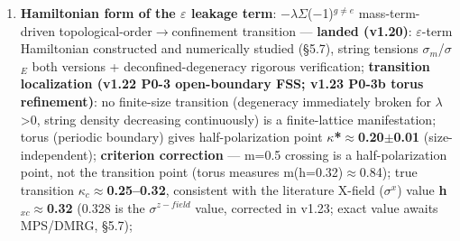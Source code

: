 \documentclass[12pt]{article}
\newcommand{\up}[1]{\ensuremath{^{#1}}}
\newcommand{\down}[1]{\ensuremath{_{#1}}}
\begin{document}
\begin{enumerate}
\item \textbf{Hamiltonian form of the \ensuremath{\varepsilon} leakage term}: \ensuremath{-}\ensuremath{\lambda}\ensuremath{\Sigma}(\ensuremath{-}1)\up{g\neq{}e} mass-term-driven topological-order\ensuremath{\to}confinement transition --- \textbf{\checkmark landed (v1.20)}: \ensuremath{\varepsilon}-term Hamiltonian constructed and numerically studied (\S{}5.7), string tensions \ensuremath{\sigma}\down{m}/\ensuremath{\sigma}\down{E} both versions + deconfined-degeneracy rigorous verification; \textbf{\checkmark transition localization (v1.22 P0-3 open-boundary FSS; v1.23 P0-3b torus refinement)}: no finite-size transition (degeneracy immediately broken for \ensuremath{\lambda}>0, string density decreasing continuously) is a finite-lattice manifestation; torus (periodic boundary) gives half-polarization point \textbf{\ensuremath{\kappa}*\ensuremath{\approx}0.20\ensuremath{\pm}0.01} (size-independent); \textbf{criterion correction} --- m=0.5 crossing is a half-polarization point, not the transition point (torus measures m(h=0.32)\ensuremath{\approx}0.84); true transition \textbf{\ensuremath{\kappa}\down{c}\ensuremath{\approx}0.25--0.32}, consistent with the literature X-field (\ensuremath{\sigma}\up{x}) value \textbf{h\down{xc}\ensuremath{\approx}0.32} (0.328 is the \ensuremath{\sigma}\up{z-field} value, corrected in v1.23; exact value awaits MPS/DMRG, \S{}5.7);

\end{enumerate}
\end{document}
